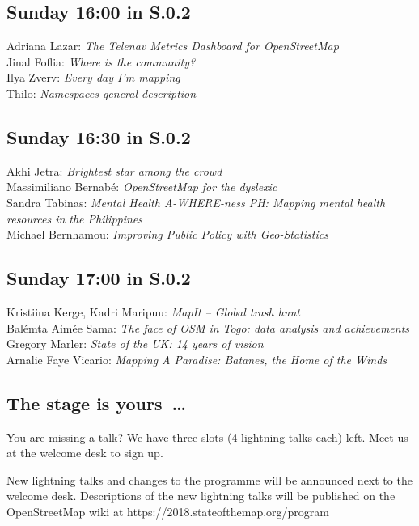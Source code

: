 \subsection*{Sunday 16:00 in S.0.2}
Adriana Lazar: \emph{The Telenav Metrics Dashboard for OpenStreetMap}\\
Jinal Foflia: \emph{Where is the community?}\\
Ilya Zverv: \emph{Every day I'm mapping}\\
Thilo: \emph{Namespaces general description}

\subsection*{Sunday 16:30 in S.0.2}
Akhi Jetra: \emph{Brightest star among the crowd}\\
Massimiliano Bernabé: \emph{OpenStreetMap for the dyslexic}\\
Sandra Tabinas: \emph{Mental Health A-WHERE-ness PH: Mapping mental health resources in the Philippines}\\
Michael Bernhamou: \emph{Improving Public Policy with Geo-Statistics}

\subsection*{Sunday 17:00 in S.0.2}
Kristiina Kerge, Kadri Maripuu: \emph{MapIt -- Global trash hunt}\\
Balémta Aimée Sama: \emph{The face of OSM in Togo: data analysis and achievements}\\
Gregory Marler: \emph{State of the UK: 14 years of vision}\\
Arnalie Faye Vicario: \emph{Mapping A Paradise: Batanes, the Home of the Winds}

\subsection*{The stage is yours~\dots}

You are missing a talk? We have three slots (4 lightning talks each) left. Meet us at the welcome desk to
sign up.

New lightning talks and changes to the programme will be announced next to the welcome desk. Descriptions of the new lightning talks will be published on the OpenStreetMap wiki at \mbox{https://2018.stateofthemap.org/program}
